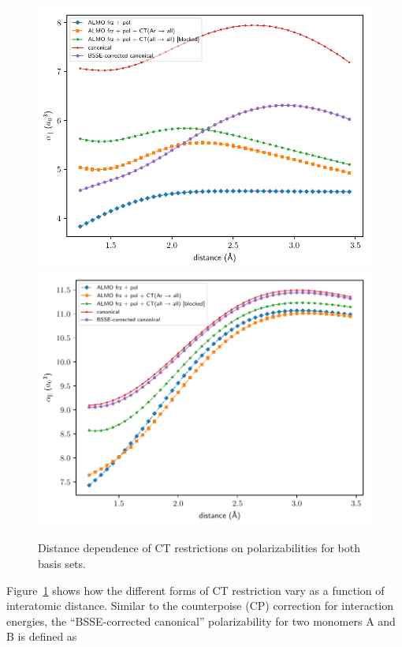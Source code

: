 \begin{figure}[H]
  \centering
  \includegraphics[scale=1.00]{paper_04/almo_vs_bsse_canonical_onaxis_projected_short_def2-SVP.pdf}
  \includegraphics[scale=1.00]{paper_04/almo_vs_bsse_canonical_onaxis_projected_short_def2-SVPD.pdf}
  \caption{Distance dependence of CT restrictions on polarizabilities for both basis sets.}
  \label{fig:distance-dependence-ct-levels}
\end{figure}

Figure~\ref{fig:distance-dependence-ct-levels} shows how the different forms of CT restriction vary as a function of interatomic distance. Similar to the counterpoise (CP) correction for interaction energies, the ``BSSE-corrected canonical'' polarizability for two monomers A and B is defined as

